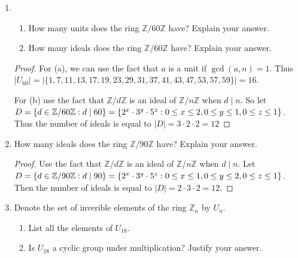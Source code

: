 \documentclass{article}
\theoremstyle{definition}
\begin{document}
\begin{enumerate}
            \item 
                \begin{enumerate}
                    \item How many units does the ring $\mathbb{Z}/60\mathbb{Z}$ have? Explain your answer.
                    \item How many ideals does the ring $\mathbb{Z}/60\mathbb{Z}$ have? Explain your answer.
                \end{enumerate}
                \begin{proof}
                    For (a), we can use the fact that $a$ is a unit if $\gcd(a,n)=1$. Thus \\ $\mid  U_{60} \mid =\mid \{1,7,11,13,17,19,23,29,31,37,41,43,47,53,57,59\}\mid =16$.

                    For (b) use the fact that $\mathbb{Z}/d\mathbb{Z}$ is an ideal of $\mathbb{Z}/n\mathbb{Z}$ when $d\mid n$. So let $D=\{d\in \mathbb{Z}/60\mathbb{Z}:d\mid 60\}=\\ \{2^x\cdot 3^y\cdot 5^z:0\leq x\leq 2, 0\leq y \leq 1, 0 \leq z \leq 1\}$. Thus the number of ideals is equal to $\mid D\mid =3\cdot 2 \cdot 2=12$
                \end{proof}

            \item How many ideals does the ring $\mathbb{Z}/90\mathbb{Z}$ have? Explain your answer.
                \begin{proof}
                    Use the fact that $\mathbb{Z}/d\mathbb{Z}$ is an ideal of $\mathbb{Z}/n\mathbb{Z}$ when $d\mid n$. Let $D=\{d\in \mathbb{Z}/90\mathbb{Z}:d\mid 90\}= \\ \{2^x \cdot 3^y \cdot 5^z: 0\leq x \leq 1, 0\leq y \leq 2, 0\leq z \leq 1\}$. Then the number of ideals is equal to $\mid D\mid =2\cdot 3 \cdot 2=12$.
                \end{proof}

            \item Denote the set of inverible elements of the ring $\mathbb{Z}_n$ by $U_n$.
                \begin{enumerate}
                    \item List all the elements of $U_{18}$.
                    \item Is $U_{18}$ a cyclic group under multiplication? Justify your answer.
                \end{enumerate}
                

\end{enumerate}
\end{document}
